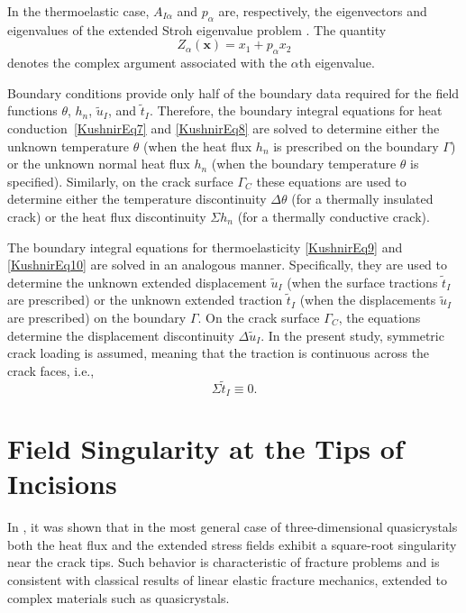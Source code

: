 	In the thermoelastic case, $A_{I\alpha}$ and $p_{\alpha}$ are,
	respectively, the eigenvectors and eigenvalues of the extended Stroh
	eigenvalue problem \cite{Kushnir34}. The quantity
	\[
	Z_{\alpha}(\mathbf{x}) = x_{1} + p_{\alpha}x_{2}
	\]
	denotes the complex argument associated with the $\alpha$th eigenvalue.
	
	Boundary conditions provide only half of the boundary data required
	for the field functions $\theta$, $h_{n}$, $\tilde{u}_{I}$, and
	$\tilde{t}_{I}$. Therefore, the boundary integral equations for heat
	conduction~\eqref{KushnirEq7} and  \eqref{KushnirEq8} are solved to determine
	either the unknown temperature $\theta$ (when the heat flux $h_{n}$
	is prescribed on the boundary $\Gamma$) or the unknown normal heat
	flux $h_{n}$ (when the boundary temperature $\theta$ is specified).
	Similarly, on the crack surface $\Gamma_{C}$ these equations are used
	to determine either the temperature discontinuity $\Delta\theta$
	(for a thermally insulated crack) or the heat flux discontinuity
	$\Sigma h_{n}$ (for a thermally conductive crack).
	
	The boundary integral equations for thermoelasticity
    \eqref{KushnirEq9} and \eqref{KushnirEq10} are solved in an analogous manner.
	Specifically, they are used to determine the unknown extended
	displacement $\tilde{u}_{I}$ (when the surface tractions $\tilde{t}_{I}$
	are prescribed) or the unknown extended traction $\tilde{t}_{I}$ (when
	the displacements $\tilde{u}_{I}$ are prescribed) on the boundary
	$\Gamma$. On the crack surface $\Gamma_{C}$, the equations determine
	the displacement discontinuity $\Delta\tilde{u}_{I}$. In the present
	study, symmetric crack loading is assumed, meaning that the traction
	is continuous across the crack faces, i.e.,
	\[
	\Sigma\tilde{t}_{I}\equiv 0 .
	\]

\section{Field Singularity at the Tips of Incisions}

In \cite{Kushnir34}, it was shown that in the most general case of
three-dimensional quasicrystals both the heat flux and the extended
stress fields exhibit a square-root singularity near the crack tips.
Such behavior is characteristic of fracture problems and is consistent
with classical results of linear elastic fracture mechanics, extended
to complex materials such as quasicrystals.


